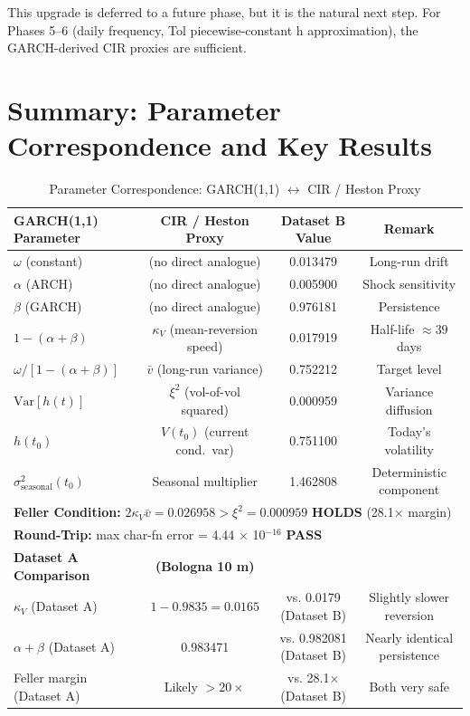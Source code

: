 \documentclass[11pt, a4paper, twoside]{article}
\begin{document}
This upgrade is deferred to a future phase, but it is the natural next step. For Phases 5--6 (daily frequency, Tol piecewise-constant h approximation), the GARCH-derived CIR proxies are sufficient.

\section{Summary: Parameter Correspondence and Key Results}

\begin{table}[ht]
\centering
\caption{Parameter Correspondence: GARCH(1,1) $\leftrightarrow$ CIR / Heston Proxy}
\label{tbl:param_correspond}
\small
\begin{tabularx}{\textwidth}{l|cc|c}
\toprule
\textbf{GARCH(1,1) Parameter} & \textbf{CIR / Heston Proxy} & \textbf{Dataset B Value} & \textbf{Remark} \\
\midrule
$\omega$ (constant) & (no direct analogue) & 0.013479 & Long-run drift \\
$\alpha$ (ARCH) & (no direct analogue) & 0.005900 & Shock sensitivity \\
$\beta$ (GARCH) & (no direct analogue) & 0.976181 & Persistence \\
$1 - (\alpha + \beta)$ & $\kappa_V$ (mean-reversion speed) & 0.017919 & Half-life $\approx 39$ days \\
$\omega / [1 - (\alpha + \beta)]$ & $\bar{v}$ (long-run variance) & 0.752212 & Target level \\
$\text{Var}[h(t)]$ & $\xi^2$ (vol-of-vol squared) & 0.000959 & Variance diffusion \\
$h(t_0)$ & $V(t_0)$ (current cond.\ var) & 0.751100 & Today's volatility \\
$\sigma^2_{\text{seasonal}}(t_0)$ & Seasonal multiplier & 1.462808 & Deterministic component \\
\midrule
\multicolumn{4}{l}{\textbf{Feller Condition:} $2 \kappa_V \bar{v} = 0.026958 > \xi^2 = 0.000959$ \textbf{HOLDS} (28.1× margin)} \\
\multicolumn{4}{l}{\textbf{Round-Trip:} max char-fn error = 4.44 × 10$^{-16}$ \textbf{PASS}} \\
\midrule
\textbf{Dataset A Comparison} & \textbf{(Bologna 10 m)} & & \\
$\kappa_V$ (Dataset A) & $1 - 0.9835 = 0.0165$ & vs. 0.0179 (Dataset B) & Slightly slower reversion \\
$\alpha + \beta$ (Dataset A) & 0.983471 & vs. 0.982081 (Dataset B) & Nearly identical persistence \\
Feller margin (Dataset A) & Likely $> 20\times$ & vs. 28.1× (Dataset B) & Both very safe \\
\bottomrule
\end{tabularx}
\end{table}
\end{document}
